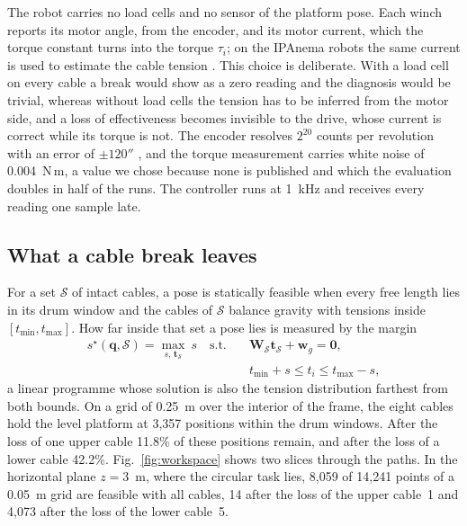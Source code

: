 \documentclass[a4paper,fleqn]{cas-dc}
\newcommand{\vc}[1]{\bm{#1}}
\newcommand{\mt}[1]{\mathbf{#1}}
\begin{document}
The robot carries no load cells and no sensor of the platform pose. Each winch reports its motor angle, from the encoder, and its motor current, which the torque constant turns into the torque $\tau_i$; on the IPAnema robots the same current is used to estimate the cable tension \citep{pott2013ipanema}. This choice is deliberate. With a load cell on every cable a break would show as a zero reading and the diagnosis would be trivial, whereas without load cells the tension has to be inferred from the motor side, and a loss of effectiveness becomes invisible to the drive, whose current is correct while its torque is not. The encoder resolves $2^{20}$ counts per revolution with an error of $\pm120''$ \citep{rexroth_msk2018}, and the torque measurement carries white noise of 0.004~N\,m, a value we chose because none is published and which the evaluation doubles in half of the runs. The controller runs at 1~kHz and receives every reading one sample late.

\subsection{What a cable break leaves}\label{sec:workspace}

For a set $\mathcal S$ of intact cables, a pose is statically feasible when every free length lies in its drum window and the cables of $\mathcal S$ balance gravity with tensions inside $[t_{\min},t_{\max}]$. How far inside that set a pose lies is measured by the margin
\begin{equation}\label{eq:margin}
\begin{aligned}
s^\star(\vc q,\mathcal S)=\max_{s,\,\vc t_{\mathcal S}}\ s\quad\text{s.t.}\quad&\mt W_{\mathcal S}\vc t_{\mathcal S}+\vc w_g=\vc 0,\\
&t_{\min}+s\le t_i\le t_{\max}-s,
\end{aligned}
\end{equation}
a linear programme whose solution is also the tension distribution farthest from both bounds. On a grid of 0.25~m over the interior of the frame, the eight cables hold the level platform at 3,357 positions within the drum windows. After the loss of one upper cable 11.8\% of these positions remain, and after the loss of a lower cable 42.2\%. Fig.~\ref{fig:workspace} shows two slices through the paths. In the horizontal plane $z=3$~m, where the circular task lies, 8,059 of 14,241 points of a 0.05~m grid are feasible with all cables, 14 after the loss of the upper cable~1 and 4,073 after the loss of the lower cable~5.
\end{document}
